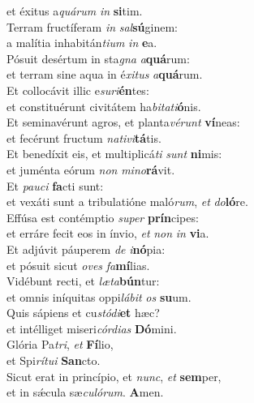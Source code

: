 \oddverse et éxitus a\textit{quá}\textit{rum} \textit{in} \textbf{si}tim.\\
\evenverse Terram fructíferam \textit{in} \textit{sal}\textbf{sú}ginem:~\*\\
\evenverse a malítia inhabitán\textit{ti}\textit{um} \textit{in} \textbf{e}a.\\
\oddverse Pósuit desértum in sta\textit{gna} \textit{a}\textbf{quá}rum:~\*\\
\oddverse et terram sine aqua in é\textit{xi}\textit{tus} \textit{a}\textbf{quá}rum.\\
\evenverse Et collocávit illic e\textit{su}\textit{ri}\textbf{én}tes:~\*\\
\evenverse et constituérunt civitátem ha\textit{bi}\textit{ta}\textit{ti}\textbf{ó}nis.\\
\oddverse Et seminavérunt agros, et planta\textit{vé}\textit{runt} \textbf{ví}neas:~\*\\
\oddverse et fecérunt fructum \textit{na}\textit{ti}\textit{vi}\textbf{tá}tis.\\
\evenverse Et benedíxit eis, et multiplicá\textit{ti} \textit{sunt} \textbf{ni}mis:~\*\\
\evenverse et juménta eórum \textit{non} \textit{mi}\textit{no}\textbf{rá}vit.\\
\oddverse Et \textit{pau}\textit{ci} \textbf{fa}cti sunt:~\*\\
\oddverse et vexáti sunt a tribulatióne maló\textit{rum}, \textit{et} \textit{do}\textbf{ló}re.\\
\evenverse Effúsa est contémptio \textit{su}\textit{per} \textbf{prín}cipes:~\*\\
\evenverse et erráre fecit eos in ínvio, \textit{et} \textit{non} \textit{in} \textbf{vi}a.\\
\oddverse Et adjúvit páuperem \textit{de} \textit{i}\textbf{nó}pia:~\*\\
\oddverse et pósuit sicut \textit{o}\textit{ves} \textit{fa}\textbf{mí}lias.\\
\evenverse Vidébunt recti, et \textit{læ}\textit{ta}\textbf{bún}tur:~\*\\
\evenverse et omnis iníquitas oppi\textit{lá}\textit{bit} \textit{os} \textbf{su}um.\\
\oddverse Quis sápiens et cu\textit{stó}\textit{di}\textbf{et} hæc?~\*\\
\oddverse et intélliget miseri\textit{cór}\textit{di}\textit{as} \textbf{Dó}mini.\\
\evenverse Glória Pa\textit{tri}, \textit{et} \textbf{Fí}lio,~\*\\
\evenverse et Spi\textit{rí}\textit{tu}\textit{i} \textbf{San}cto.\\
\oddverse Sicut erat in princípio, et \textit{nunc}, \textit{et} \textbf{sem}per,~\*\\
\oddverse et in sǽcula sæ\textit{cu}\textit{ló}\textit{rum}. \textbf{A}men.\\
